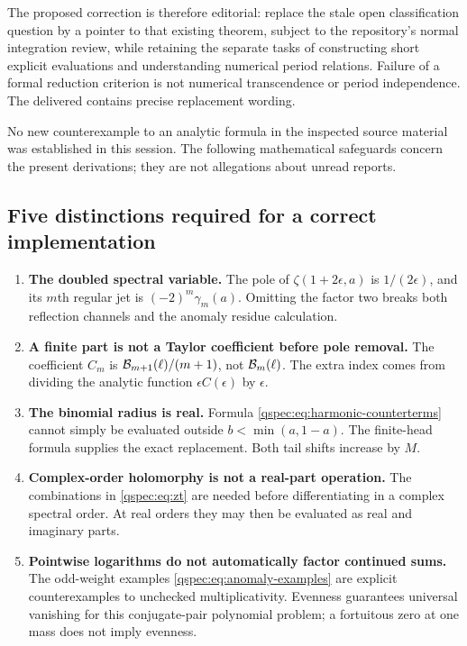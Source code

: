 The proposed correction is therefore editorial: replace the stale open
classification question by a pointer to that existing theorem, subject
to the repository's normal integration review, while retaining the
separate tasks of constructing short explicit evaluations and understanding
numerical period relations. Failure of a formal reduction criterion is
not numerical transcendence or period independence. The delivered
 contains precise replacement wording.

No new counterexample to an analytic formula in the inspected source
material was established in this session. The following mathematical
safeguards concern the present derivations; they are not allegations
about unread reports.

\subsection{Five distinctions required for a correct implementation}
\begin{enumerate}
\item \textbf{The doubled spectral variable.} The pole of
$\zeta(1+2\epsilon,a)$ is $1/(2\epsilon)$, and its $m$th regular
jet is $(-2)^m\gamma_m(a)$. Omitting the factor two breaks both
reflection channels and the anomaly residue calculation.
\item \textbf{A finite part is not a Taylor coefficient before pole removal.}
The coefficient $C_m$ is
$\mathcal B_{m+1}(\ell)/(m+1)$, not $\mathcal B_m(\ell)$. The extra index comes
from dividing the analytic function $\epsilon C(\epsilon)$ by
$\epsilon$.
\item \textbf{The binomial radius is real.} Formula
\eqref{qspec:eq:harmonic-counterterms} cannot simply be evaluated outside
$b<\min(a,1-a)$. The finite-head formula supplies the exact replacement.
Both tail shifts increase by $M$.
\item \textbf{Complex-order holomorphy is not a real-part operation.}
The combinations in \eqref{qspec:eq:zt} are needed before differentiating
in a complex spectral order. At real orders they may then be evaluated
as real and imaginary parts.
\item \textbf{Pointwise logarithms do not automatically factor continued sums.}
The odd-weight examples \eqref{qspec:eq:anomaly-examples} are explicit
counterexamples to unchecked multiplicativity. Evenness guarantees
universal vanishing for this conjugate-pair polynomial problem; a
fortuitous zero at one mass does not imply evenness.
\end{enumerate}

